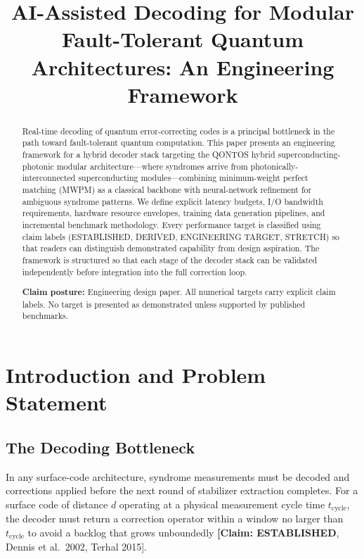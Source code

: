 \documentclass[conference]{IEEEtran}
\begin{document}
\title{AI-Assisted Decoding for Modular Fault-Tolerant Quantum Architectures: An Engineering Framework}

\author{\qontosauthor}

\maketitle

\begin{abstract}
Real-time decoding of quantum error-correcting codes is a principal bottleneck in the path toward fault-tolerant quantum computation. This paper presents an engineering framework for a hybrid decoder stack targeting the QONTOS hybrid superconducting-photonic modular architecture---where syndromes arrive from photonically-interconnected superconducting modules---combining minimum-weight perfect matching (MWPM) as a classical backbone with neural-network refinement for ambiguous syndrome patterns. We define explicit latency budgets, I/O bandwidth requirements, hardware resource envelopes, training data generation pipelines, and incremental benchmark methodology. Every performance target is classified using claim labels (ESTABLISHED, DERIVED, ENGINEERING TARGET, STRETCH) so that readers can distinguish demonstrated capability from design aspiration. The framework is structured so that each stage of the decoder stack can be validated independently before integration into the full correction loop.

\textbf{Claim posture:} Engineering design paper. All numerical targets carry explicit claim labels. No target is presented as demonstrated unless supported by published benchmarks.
\end{abstract}

\section{Introduction and Problem Statement}

\subsection{The Decoding Bottleneck}

In any surface-code architecture, syndrome measurements must be decoded and corrections applied before the next round of stabilizer extraction completes. For a surface code of distance $d$ operating at a physical measurement cycle time $t_{\text{cycle}}$, the decoder must return a correction operator within a window no larger than $t_{\text{cycle}}$ to avoid a backlog that grows unboundedly \textbf{[Claim: ESTABLISHED}, Dennis et al.\ 2002, Terhal 2015].
\end{document}
